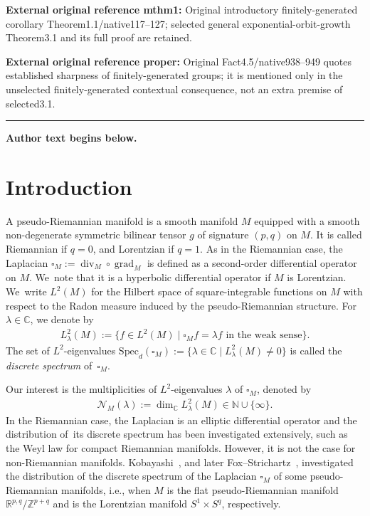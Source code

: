 \documentclass[11pt]{article}
\numberwithin{equation}{section}
\numberwithin{equation}{section}
\begin{document}
\noindent\textbf{External original reference mthm1:} Original introductory finitely-generated corollary Theorem1.1/native117–127; selected general exponential-orbit-growth Theorem3.1 and its full proof are retained.\par
\noindent\textbf{External original reference proper:} Original Fact4.5/native938–949 quotes established sharpness of finitely-generated groups; it is mentioned only in the unselected finitely-generated contextual consequence, not an extra premise of selected3.1.\par
\medskip\hrule\medskip\noindent\textbf{Author text begins below.}\par

\section{Introduction}
A pseudo-Riemannian manifold is a smooth manifold $M$ equipped with
a smooth non-degenerate symmetric bilinear tensor $g$
 of signature $(p,q)$ on $M$.
It is called Riemannian if $q=0$, and Lorentzian if $q=1$.
As in the Riemannian case,
the Laplacian $\square_{M}:=\operatorname{div}_{M} \circ \operatorname{grad}_{M}$
is defined as a second-order differential operator on $M$. We~note that it is a
hyperbolic differential operator if $M$ is Lorentzian. We~write $L^2(M)$ for the Hilbert space of square-integrable functions on $M$
with respect to the Radon measure induced by the pseudo-Riemannian structure.
For $\lambda \in \mathbb{C}$, we denote by
\begin{gather*}
L^2_{\lambda}(M) :=
\big\{f \in L^2(M) \mid \square_{M}f = \lambda f \text{ in the weak sense}\big\}.
\end{gather*}
The set of $L^2$-eigenvalues
$\mathrm{Spec}_{d}(\square_{M}) := \big\{ \lambda \in \mathbb{C}
\mid L^2_{\lambda}(M)\neq0\big\}$
is called the \textit{discrete spectrum} of~$\square_{M}$.

Our interest is the multiplicities of $L^2$-eigenvalues $\lambda$ of $\square_{M}$,
denoted by
\begin{gather*}
\mathcal{N}_{M}(\lambda):= \operatorname{dim}_{\mathbb{C}}L^2_{\lambda}(M)
\in \mathbb{N}\cup\{\infty\}.
\end{gather*}
In the Riemannian case, the Laplacian is an elliptic differential operator
and the distribution of~its discrete spectrum has been investigated extensively,
such as the Weyl law for compact Riemannian manifolds.
However, it is not the case for non-Riemannian manifolds.
Kobayashi~\cite{Kob16}, and later Fox--Strichartz~\cite{FoSt18},
investigated the distribution of the discrete spectrum of
the Laplacian $\square_{M}$ of some pseudo-Riemannian manifolds, i.e., when
$M$ is the flat pseudo-Riemannian manifold $\mathbb{R}^{p,q}/\mathbb{Z}^{p+q}$
and is the Lorentzian manifold $S^1\times S^{q}$, respectively.
\end{document}

